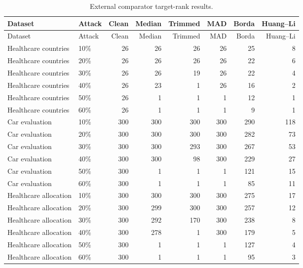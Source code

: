 \begin{longtable}{llrrrrrr}
\caption{External comparator target-rank results.}
\label{tab:external-comparators}\\
\toprule
Dataset & Attack & Clean & Median & Trimmed & MAD & Borda & Huang--Li \\
\midrule
\endfirsthead
\toprule
Dataset & Attack & Clean & Median & Trimmed & MAD & Borda & Huang--Li \\
\midrule
\endhead
Healthcare countries & 10\% & 26 & 26 & 26 & 26 & 25 & 8 \\
Healthcare countries & 20\% & 26 & 26 & 26 & 26 & 22 & 6 \\
Healthcare countries & 30\% & 26 & 26 & 19 & 26 & 22 & 4 \\
Healthcare countries & 40\% & 26 & 23 & 1 & 26 & 16 & 2 \\
Healthcare countries & 50\% & 26 & 1 & 1 & 1 & 12 & 1 \\
Healthcare countries & 60\% & 26 & 1 & 1 & 1 & 9 & 1 \\
Car evaluation & 10\% & 300 & 300 & 300 & 300 & 290 & 118 \\
Car evaluation & 20\% & 300 & 300 & 300 & 300 & 282 & 73 \\
Car evaluation & 30\% & 300 & 300 & 293 & 300 & 267 & 53 \\
Car evaluation & 40\% & 300 & 300 & 98 & 300 & 229 & 27 \\
Car evaluation & 50\% & 300 & 1 & 1 & 1 & 121 & 15 \\
Car evaluation & 60\% & 300 & 1 & 1 & 1 & 85 & 11 \\
Healthcare allocation & 10\% & 300 & 300 & 300 & 300 & 275 & 17 \\
Healthcare allocation & 20\% & 300 & 299 & 300 & 300 & 257 & 12 \\
Healthcare allocation & 30\% & 300 & 292 & 170 & 300 & 238 & 8 \\
Healthcare allocation & 40\% & 300 & 278 & 1 & 300 & 179 & 5 \\
Healthcare allocation & 50\% & 300 & 1 & 1 & 1 & 127 & 4 \\
Healthcare allocation & 60\% & 300 & 1 & 1 & 1 & 95 & 3 \\
\bottomrule
\end{longtable}
